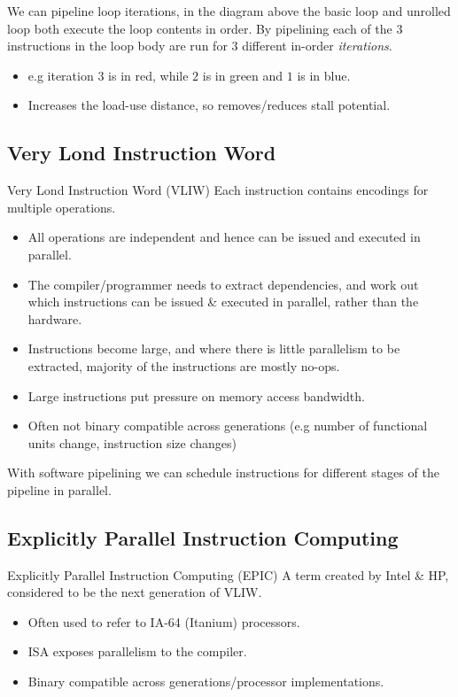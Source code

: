 We can pipeline loop iterations, in the diagram above the basic loop and unrolled loop both execute the loop contents in order. By pipelining each of the 3 instructions in the loop body are run for 3 different in-order \textit{iterations}.
\begin{itemize}
	\item e.g iteration $3$ is in red, while $2$ is in green and $1$ is in blue.
	\item Increases the load-use distance, so removes/reduces stall potential.
\end{itemize}

\subsection{Very Lond Instruction Word}
\begin{definitionbox}{Very Lond Instruction Word (VLIW)}
	Each instruction contains encodings for multiple operations.
	\begin{itemize}
		\item All operations are independent and hence can be issued and executed in parallel.
		\item The compiler/programmer needs to extract dependencies, and work out which instructions can be issued \& executed in parallel, rather than the hardware.
		\item Instructions become large, and where there is little parallelism to be extracted, majority of the instructions are mostly no-ops.
		\item Large instructions put pressure on memory access bandwidth.
		\item Often not binary compatible across generations (e.g number of functional units change, instruction size changes)
	\end{itemize}
\end{definitionbox}
With software pipelining we can schedule instructions for different stages of the pipeline in parallel.

\subsection{Explicitly Parallel Instruction Computing}
\begin{definitionbox}{Explicitly Parallel Instruction Computing (EPIC)}
	A term created by Intel \& HP, considered to be the next generation of VLIW.
	\begin{itemize}
		\item Often used to refer to IA-64 (Itanium) processors.
		\item ISA exposes parallelism to the compiler.
		\item Binary compatible across generations/processor implementations.
	\end{itemize}
\end{definitionbox}

